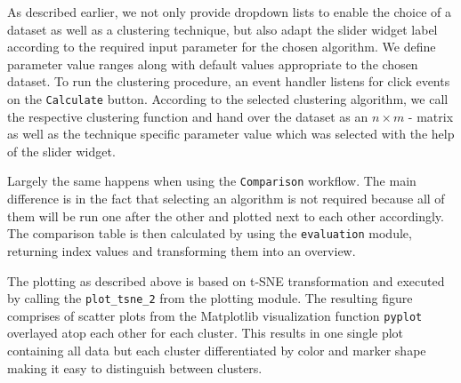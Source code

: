 As described earlier, we not only provide dropdown lists to enable the choice of a dataset as well as a clustering technique, but also adapt the slider widget label according to the required input parameter for the chosen algorithm. We define parameter value ranges along with default values appropriate to the chosen dataset. 
To run the clustering procedure, an event handler listens for click events on the \texttt{Calculate} button. According to the selected clustering algorithm, we call the respective clustering function and hand over the dataset as an $n \times m$ - matrix as well as the technique specific parameter value which was selected with the help of the slider widget.

Largely the same happens when using the \texttt{Comparison} workflow. The main difference is in the fact that selecting an algorithm is not required because all of them will be run one after the other and plotted next to each other accordingly. The comparison table is then calculated by using the \texttt{evaluation} module, returning index values and transforming them into an overview.

The plotting as described above is based on \gls{t-SNE} transformation and executed by calling the \texttt{plot_tsne_2} from the plotting module. The resulting figure comprises of scatter plots from the Matplotlib visualization function \texttt{pyplot} \cite{Hunter:2007} overlayed atop each other for each cluster. This results in one single plot containing all data but each cluster differentiated by color and marker shape making it easy to distinguish between clusters.